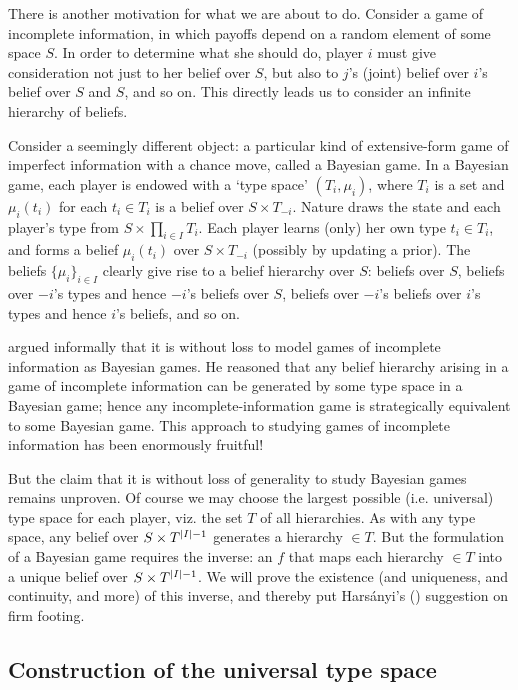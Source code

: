 \documentclass[11pt,letterpaper,reqno,oneside]{article}
\begin{document}
There is another motivation for what we are about to do. Consider a game of incomplete information, in which payoffs depend on a random element of some space $S$. In order to determine what she should do, player $i$ must give consideration not just to her belief over $S$, but also to $j$'s (joint) belief over $i$'s belief over $S$ and $S$, and so on. This directly leads us to consider an infinite hierarchy of beliefs.

Consider a seemingly different object: a particular kind of extensive-form game of imperfect information with a chance move, called a Bayesian game. In a Bayesian game, each player is endowed with a `type space' $(T_i,\mu_i)$, where $T_i$ is a set and $\mu_i(t_i)$ for each $t_i \in T_i$ is a belief over $S \times T_{-i}$. Nature draws the state and each player's type from $S \times \prod_{i \in I} T_i$. Each player learns (only) her own type $t_i \in T_i$, and forms a belief $\mu_i(t_i)$ over $S \times T_{-i}$ (possibly by updating a prior). The beliefs $\{ \mu_i \}_{i \in I}$ clearly give rise to a belief hierarchy over $S$: beliefs over $S$, beliefs over $-i$'s types and hence $-i$'s beliefs over $S$, beliefs over $-i$'s beliefs over $i$'s types and hence $i$'s beliefs, and so on. 

\textcite{Harsanyi1967} argued informally that it is without loss to model games of incomplete information as Bayesian games. He reasoned that any belief hierarchy arising in a game of incomplete information can be generated by some type space in a Bayesian game; hence any incomplete-information game is strategically equivalent to some Bayesian game. This approach to studying games of incomplete information has been enormously fruitful!

But the claim that it is without loss of generality to study Bayesian games remains unproven. Of course we may choose the largest possible (i.e. universal) type space for each player, viz. the set $T$ of all hierarchies. As with any type space, any belief over $S \times T^{\abs*{I}-1}$ generates a hierarchy $\in T$. But the formulation of a Bayesian game requires the inverse: an $f$ that maps each hierarchy $\in T$ into a unique belief over $S \times T^{\abs*{I}-1}$. We will prove the existence (and uniqueness, and continuity, and more) of this inverse, and thereby put Harsányi's (\citeyear{Harsanyi1967}) suggestion on firm footing.



\subsection{Construction of the universal type space}
\label{sec:belief_hierarchies:construction}
\end{document}
